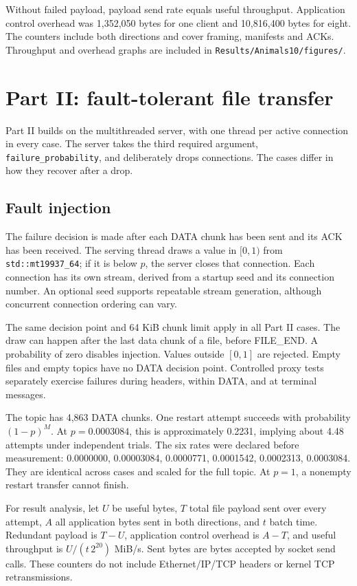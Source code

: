 \documentclass[11pt,a4paper]{article}
\newcommand{\code}[1]{\nolinkurl{#1}}
\begin{document}
Without failed payload, payload send rate equals useful throughput. Application control overhead was 1,352,050 bytes for one client and 10,816,400 bytes for eight. The counters include both directions and cover framing, manifests and ACKs. Throughput and overhead graphs are included in \code{Results/Animals10/figures/}.

\section{Part II: fault-tolerant file transfer}
Part II builds on the multithreaded server, with one thread per active connection in every case. The server takes the third required argument, \code{failure_probability}, and deliberately drops connections. The cases differ in how they recover after a drop.

\subsection{Fault injection}
The failure decision is made after each DATA chunk has been sent and its ACK has been received. The serving thread draws a value in $[0,1)$ from \code{std::mt19937_64}; if it is below $p$, the server closes that connection. Each connection has its own stream, derived from a startup seed and its connection number. An optional seed supports repeatable stream generation, although concurrent connection ordering can vary.

The same decision point and 64 KiB chunk limit apply in all Part II cases. The draw can happen after the last data chunk of a file, before FILE\_END. A probability of zero disables injection. Values outside $[0,1]$ are rejected. Empty files and empty topics have no DATA decision point. Controlled proxy tests separately exercise failures during headers, within DATA, and at terminal messages.

The topic has 4,863 DATA chunks. One restart attempt succeeds with probability $(1-p)^M$. At $p=0.0003084$, this is approximately 0.2231, implying about 4.48 attempts under independent trials. The six rates were declared before measurement: 0.0000000, 0.00003084, 0.0000771, 0.0001542, 0.0002313, 0.0003084. They are identical across cases and scaled for the full topic. At $p=1$, a nonempty restart transfer cannot finish.

For result analysis, let $U$ be useful bytes, $T$ total file payload sent over every attempt, $A$ all application bytes sent in both directions, and $t$ batch time. Redundant payload is $T-U$, application control overhead is $A-T$, and useful throughput is $U/(t\,2^{20})$ MiB/s. Sent bytes are bytes accepted by socket send calls. These counters do not include Ethernet/IP/TCP headers or kernel TCP retransmissions.
\end{document}
